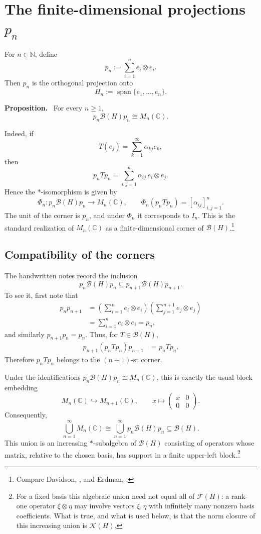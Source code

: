 \documentclass[11pt]{article}
\newcommand{\C}{\mathbb{C}}
\newcommand{\N}{\mathbb{N}}
\newcommand{\BH}{\mathcal{B}(H)}
\newcommand{\FH}{\mathcal{F}(H)}
\newcommand{\KH}{\mathcal{K}(H)}
\newcommand{\spann}{\operatorname{span}}
\newenvironment{proposition}{\par\medskip\noindent\textbf{Proposition.}\ }{\par\medskip}
\begin{document}
\section{The finite-dimensional projections $p_n$}

For $n\in\N$, define
\[
p_n:=\sum_{i=1}^{n}e_i\otimes e_i.
\]
Then $p_n$ is the orthogonal projection onto
\[
H_n:=\spann\{e_1,\ldots,e_n\}.
\]

\begin{proposition}
For every $n\ge1$,
\[
p_n\BH p_n\cong M_n(\C).
\]
\end{proposition}

\noindent
Indeed, if
\[
T(e_j)=\sum_{k=1}^{\infty}\alpha_{kj}e_k,
\]
then
\[
p_nTp_n
 =\sum_{i,j=1}^{n}\alpha_{ij}\,e_i\otimes e_j.
\]
Hence the $*$-isomorphism is given by
\[
\Phi_n:p_n\BH p_n\longrightarrow M_n(\C),
\qquad
\Phi_n(p_nTp_n)=[\alpha_{ij}]_{i,j=1}^{n}.
\]
The unit of the corner is $p_n$, and under $\Phi_n$ it corresponds to $I_n$.
This is the standard realization of $M_n(\C)$ as a finite-dimensional corner of
$\BH$.\footnote{Compare Davidson, \cite[\S I.10]{Davidson1996}, and Erdman,
\cite[\S 7.3--7.4]{Erdman2011}.}

\subsection{Compatibility of the corners}

The handwritten notes record the inclusion
\[
p_n\BH p_n\subseteq p_{n+1}\BH p_{n+1}.
\]
To see it, first note that
\begin{align*}
p_np_{n+1}
&=\left(\sum_{i=1}^{n}e_i\otimes e_i\right)
  \left(\sum_{j=1}^{n+1}e_j\otimes e_j\right)\\
&=\sum_{i=1}^{n}e_i\otimes e_i
 =p_n,
\end{align*}
and similarly $p_{n+1}p_n=p_n$.
Thus, for $T\in\BH$,
\begin{align*}
p_{n+1}(p_nTp_n)p_{n+1}
 &=p_nTp_n.
\end{align*}
Therefore $p_nTp_n$ belongs to the $(n+1)$-st corner.

Under the identifications $p_n\BH p_n\cong M_n(\C)$, this is exactly the usual
block embedding
\[
M_n(\C)\hookrightarrow M_{n+1}(\C),
\qquad
x\longmapsto
\begin{pmatrix}
x&0\\
0&0
\end{pmatrix}.
\]
Consequently,
\[
\bigcup_{n=1}^{\infty}M_n(\C)
\cong
\bigcup_{n=1}^{\infty}p_n\BH p_n
\subseteq \BH.
\]
This union is an increasing $*$-subalgebra of $\BH$ consisting of operators whose
matrix, relative to the chosen basis, has support in a finite upper-left block.\footnote{For
a fixed basis this algebraic union need not equal all of $\FH$: a rank-one operator
$\xi\otimes\eta$ may involve vectors $\xi,\eta$ with infinitely many nonzero basis
coefficients.  What is true, and what is used below, is that the norm closure of this
increasing union is $\KH$.}
\end{document}
